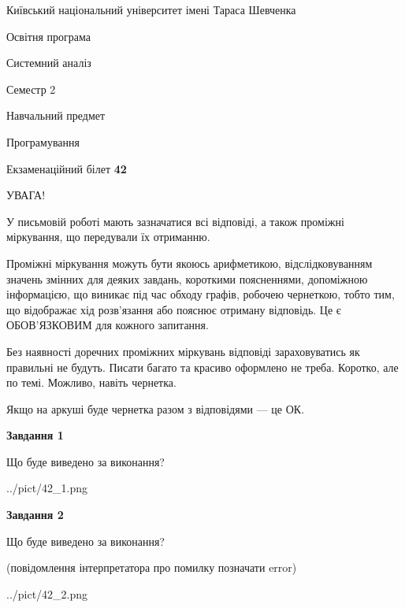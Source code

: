 \documentclass[12pt, ukrainian]{article}
\begin{document}
{{\begin {small}\par
{ \center  Київський національний університет імені Тараса Шевченка \par}
{\parbox {5 cm}{Освітня програма \hfill}{\parbox {7 cm}{Системний аналіз \hfill}}\parbox {6 cm}{\hfill Семестр 2}}\par
{\parbox {5 cm} {Навчальний предмет \hfill}\parbox {7 cm}{Програмування \hfill}\parbox {6cm}{\hfill}\par}\vspace{-7pt} \end{small}}{\center Екзаменаційний білет \No \textbf
{ 42 }\par}}
{
\begin {large}
УВАГА!

У письмовій роботі мають зазначатися всі відповіді, а також проміжні міркування, що передували їх отриманню.

Проміжні міркування можуть бути якоюсь арифметикою, відслідковуванням зна\-чень змінних для деяких завдань,
короткими поясненнями, допоміжною інформацією, що виникає під час обходу графів, робочею чернеткою,
тобто тим, що відображає хід розв’язання або пояснює отриману відповідь.
Це є ОБОВ’ЯЗКОВИМ для кожного запитання.

Без наявності доречних проміжних міркувань відповіді зараховуватись як правиль\-ні не будуть.
Писати багато та красиво оформлено не треба. Коротко, але по темі. Можли\-во, навіть чернетка.

Якщо на аркуші буде чернетка разом з відповідями --- це ОК.

\newpage

{\begin {center}\textbf{Завдання 1}\end {center}}\par
Що буде виведено за виконання?\par
\begin{center}
	{../pict/42_1.png}
\end{center}
\newpage

{\begin {center}\textbf{Завдання 2}\end {center}}\par
Що буде виведено за виконання?\par
 (повідомлення інтерпретатора про помилку позначати error)\par
\begin{center}
	{../pict/42_2.png}
\end{center}
\newpage


\end{large}}
\end{document}
